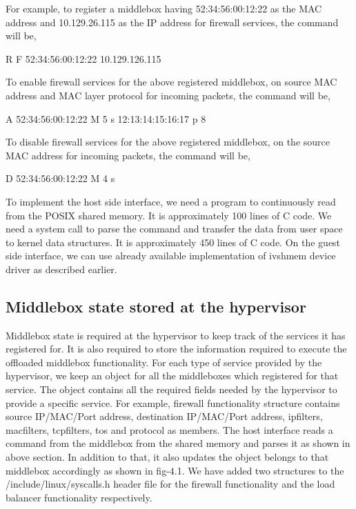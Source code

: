 \documentclass[a4paper,11pt]{report}
\begin{document}
For example, to register a middlebox having 52:34:56:00:12:22 as the MAC address and 10.129.26.115 as the IP address for firewall services, the command will be,
\begin{center} 
R F 52:34:56:00:12:22 10.129.126.115
\end{center} 
To enable firewall services for the above registered middlebox, on source MAC address and MAC layer protocol for incoming packets, the command will be,
\begin{center} 
A 52:34:56:00:12:22 M 5 s 12:13:14:15:16:17 p 8
\end{center} 
To disable firewall services for the above registered middlebox, on the source MAC address for incoming packets, the command will be,
\begin{center} 
D 52:34:56:00:12:22 M 4 s
\end{center} 

To implement the host side interface, we need a program to continuously read from the POSIX shared memory. It is approximately 100 lines of C code. We need a system call to parse the command and transfer the data from user space to kernel data structures. It is approximately 450 lines of C code. On the guest side interface, we can use already available implementation of ivshmem device driver\cite{IV} as described earlier.       
\subsection{Middlebox state stored at the hypervisor}
Middlebox state is required at the hypervisor to keep track of the services it has registered for. It is also required to store the information required to execute the offloaded middlebox functionality. For each type of service provided by the hypervisor, we keep an object for all the middleboxes which registered for that service. The object contains all the required fields needed by the hypervisor to provide a specific service. For example, firewall functionality structure contains source IP/MAC/Port address, destination IP/MAC/Port address, ipfilters, macfilters, tcpfilters, tos and protocol as members. The host interface reads a command from the middlebox from the shared memory and parses it as shown in above section. In addition to that, it also updates the object belongs to that middlebox accordingly as shown in fig-4.1. We have added two structures to the /include/linux/syscalls.h header file for the firewall functionality and the load balancer functionality respectively.    
\end{document}
